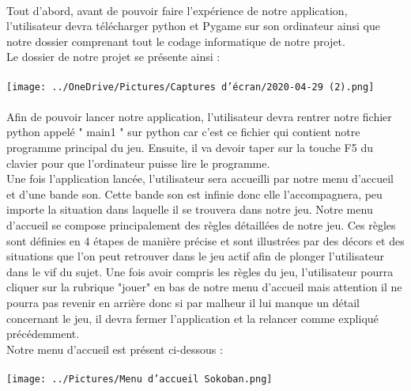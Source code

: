 \documentclass{article}
\begin{document}
\paragraph{}Tout d'abord, avant de pouvoir faire l'expérience de notre application, l'utilisateur devra télécharger python et Pygame sur son ordinateur ainsi que notre dossier comprenant tout le codage informatique de notre projet.
\\ Le dossier de notre projet se présente ainsi :
\\
\\
\texttt{[image: ../OneDrive/Pictures/Captures d’écran/2020-04-29 (2).png]} 
\\
\\ 
Afin de pouvoir lancer notre application, l'utilisateur devra rentrer notre fichier python appelé " main1 " sur python car c'est ce fichier qui contient notre programme principal du jeu. Ensuite, il va devoir taper sur la touche F5 du clavier pour que l'ordinateur puisse lire le programme. 
\\
Une fois l'application lancée, l'utilisateur sera accueilli par notre menu d'accueil et d'une bande son. Cette bande son est infinie donc elle l'accompagnera, peu importe la situation dans laquelle il se trouvera dans notre jeu. Notre menu d'accueil se compose principalement des règles détaillées de notre jeu. Ces règles sont définies en 4 étapes de manière précise et sont illustrées par des décors et des situations que l'on peut retrouver dans le jeu actif afin de plonger l'utilisateur dans le vif du sujet. Une fois avoir compris les règles du jeu, l'utilisateur pourra cliquer sur la rubrique "jouer" en bas de notre menu d'accueil mais attention il ne pourra pas revenir en arrière donc si par malheur il lui manque un détail concernant le jeu, il devra fermer l'application et la relancer comme expliqué précédemment. \\
Notre menu d'accueil est présent ci-dessous : 
\\ 
\\
\texttt{[image: ../Pictures/Menu d'accueil Sokoban.png]}
\\ 
\\ 
\end{document}
